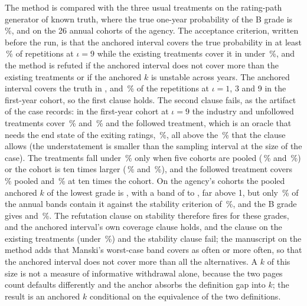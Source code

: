 The method is compared with the three usual treatments on the rating-path generator of known truth, where the true one-year probability of the B grade is \pxFourteenBTruth{}\,\%, and on the 26 annual cohorts of the agency. The acceptance criterion, written before the run, is that the anchored interval covers the true probability in at least \pxFourteenCoverTarget{}\,\% of \pxFourteenReps{} repetitions at $\iota=9$ while the existing treatments cover it in under \pxFourteenExistingTarget{}\,\%, and the method is refuted if the anchored interval does not cover more than the existing treatments or if the anchored $k$ is unstable across years. The anchored interval covers the truth in \pxFourteenAnchoredOne{}, \pxFourteenAnchoredThree{} and \pxFourteenAnchoredNine{}\,\% of the repetitions at $\iota=1$, 3 and 9 in the first-year cohort, so the first clause holds. The second clause fails, as the artifact of the case records: in the first-year cohort at $\iota=9$ the industry and unfollowed treatments cover \pxFourteenIndustryNine{}\,\% and \pxFourteenUnfollowedNine{}\,\% and the followed treatment, which is an oracle that needs the end state of the exiting ratings, \pxFourteenFollowedNine{}\,\%, all above the \pxFourteenExistingTarget{}\,\% that the clause allows (the understatement is smaller than the sampling interval at the size of the case). The treatments fall under \pxFourteenExistingTarget{}\,\% only when five cohorts are pooled (\pxFourteenIndustryPooled{}\,\% and \pxFourteenUnfollowedPooled{}\,\%) or the cohort is ten times larger (\pxFourteenIndustryTen{}\,\% and \pxFourteenUnfollowedTen{}\,\%), and the followed treatment covers \pxFourteenFollowedPooled{}\,\% pooled and \pxFourteenFollowedTen{}\,\% at ten times the cohort. On the agency's cohorts the pooled anchored $k$ of the lowest grade is \pxFourteenCccK{}, with a band of \pxFourteenCccLow{} to \pxFourteenCccHigh{}, far above 1, but only \pxFourteenCccShare{}\,\% of the annual bands contain it against the stability criterion of \pxFourteenStability{}\,\%, and the B grade gives \pxFourteenBK{} and \pxFourteenBShare{}\,\%. The refutation clause on stability therefore fires for these grades, and the anchored interval's own coverage clause holds, and the clause on the existing treatments (under \pxFourteenExistingTarget{}\,\%) and the stability clause fail; the manuscript on the method adds that Manski's worst-case band covers as often or more often, so that the anchored interval does not cover more than all the alternatives. A $k$ of this size is not a measure of informative withdrawal alone, because the two pages count defaults differently and the anchor absorbs the definition gap into $k$; the result is an anchored $k$ conditional on the equivalence of the two definitions.

